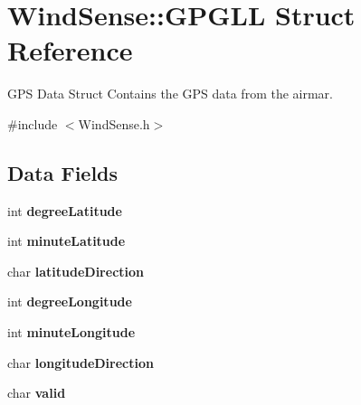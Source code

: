 \hypertarget{structWindSense_1_1GPGLL}{
\section{\-Wind\-Sense\-:\-:\-G\-P\-G\-L\-L \-Struct \-Reference}
\label{structWindSense_1_1GPGLL}
}


\-G\-P\-S \-Data \-Struct \-Contains the \-G\-P\-S data from the airmar.  




{\ttfamily \#include $<$\-Wind\-Sense.\-h$>$}

\subsection*{\-Data \-Fields}
\begin{DoxyCompactItemize}
\item 
\hypertarget{structWindSense_1_1GPGLL_a81a9535580a3b1dc8ed6fa7ad778f2cc}{
int {\bfseries degree\-Latitude}}
\label{structWindSense_1_1GPGLL_a81a9535580a3b1dc8ed6fa7ad778f2cc}

\item 
\hypertarget{structWindSense_1_1GPGLL_af4d7e37d4bda974a3398f4f8cbdb9f3e}{
int {\bfseries minute\-Latitude}}
\label{structWindSense_1_1GPGLL_af4d7e37d4bda974a3398f4f8cbdb9f3e}

\item 
\hypertarget{structWindSense_1_1GPGLL_acc23dd60b06b5e6b3708960127cda605}{
char {\bfseries latitude\-Direction}}
\label{structWindSense_1_1GPGLL_acc23dd60b06b5e6b3708960127cda605}

\item 
\hypertarget{structWindSense_1_1GPGLL_a25d47dcb1d62bbe4e10ae9311e9a1284}{
int {\bfseries degree\-Longitude}}
\label{structWindSense_1_1GPGLL_a25d47dcb1d62bbe4e10ae9311e9a1284}

\item 
\hypertarget{structWindSense_1_1GPGLL_ad85d30e607801e88d4ead6140ce7ada2}{
int {\bfseries minute\-Longitude}}
\label{structWindSense_1_1GPGLL_ad85d30e607801e88d4ead6140ce7ada2}

\item 
\hypertarget{structWindSense_1_1GPGLL_a38931004dc2c0c6a1ef6e100a96358b2}{
char {\bfseries longitude\-Direction}}
\label{structWindSense_1_1GPGLL_a38931004dc2c0c6a1ef6e100a96358b2}

\item 
\hypertarget{structWindSense_1_1GPGLL_adb66d25cabf247a970cec1b7bd76169f}{
char {\bfseries valid}}
\label{structWindSense_1_1GPGLL_adb66d25cabf247a970cec1b7bd76169f}

\end{DoxyCompactItemize}


